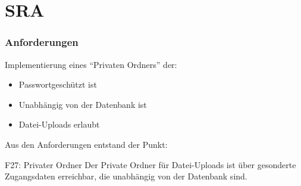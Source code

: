\section{SRA}
\begin{frame} %
  \frametitle{Anforderungen} %

Implementierung eines "`Privaten Ordners"' der:

\bigskip

  \begin{itemize}
   \item Passwortgeschützt ist
   \item Unabhängig von der Datenbank ist
   \item Datei-Uploads erlaubt
  \end{itemize}

    Aus den Anforderungen entstand der Punkt:

  \bigskip

  \begin{block}{F27: Privater Ordner}
	Der Private Ordner für Datei-Uploads ist über gesonderte Zugangsdaten erreichbar, die unabhängig von der Datenbank sind.
  \end{block}

\end{frame}
